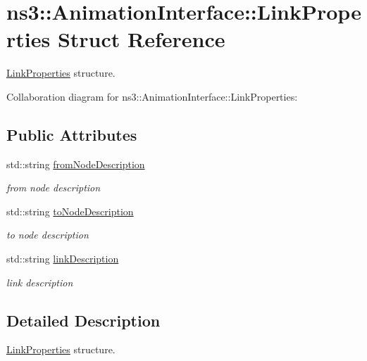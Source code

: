 \hypertarget{structns3_1_1AnimationInterface_1_1LinkProperties}{}\section{ns3\+:\+:Animation\+Interface\+:\+:Link\+Properties Struct Reference}
\label{structns3_1_1AnimationInterface_1_1LinkProperties}


\hyperlink{structns3_1_1AnimationInterface_1_1LinkProperties}{Link\+Properties} structure.  




Collaboration diagram for ns3\+:\+:Animation\+Interface\+:\+:Link\+Properties\+:
\subsection*{Public Attributes}
\begin{DoxyCompactItemize}
\item 
std\+::string \hyperlink{structns3_1_1AnimationInterface_1_1LinkProperties_a49194de50053ac5773bfef5d4dc95f9f}{from\+Node\+Description}
\begin{DoxyCompactList}\small\item\em from node description \end{DoxyCompactList}\item 
std\+::string \hyperlink{structns3_1_1AnimationInterface_1_1LinkProperties_ace49969429486a625724ec0dcd345c38}{to\+Node\+Description}
\begin{DoxyCompactList}\small\item\em to node description \end{DoxyCompactList}\item 
std\+::string \hyperlink{structns3_1_1AnimationInterface_1_1LinkProperties_aaf9b6d3ed0f26c0ba8569709adf9a5fe}{link\+Description}
\begin{DoxyCompactList}\small\item\em link description \end{DoxyCompactList}\end{DoxyCompactItemize}


\subsection{Detailed Description}
\hyperlink{structns3_1_1AnimationInterface_1_1LinkProperties}{Link\+Properties} structure. 

